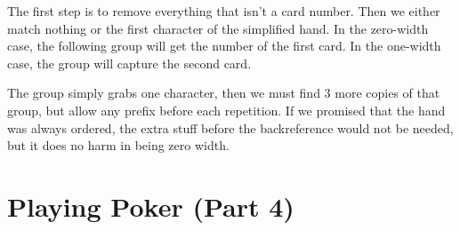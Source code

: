 \begin{Shaded}
\begin{Highlighting}[]
\OperatorTok{\textgreater{}\textgreater{}} 
\OperatorTok{=}\NormalTok{, }\StringTok{\textquotesingle{}\textquotesingle{}}
\OperatorTok{=} \VerbatimStringTok{\textquotesingle{}}
\OperatorTok{=}
\NormalTok{) } 
\OperatorTok{\textgreater{}\textgreater{}\textgreater{}}\NormalTok{) }
\CommentTok{\textquotesingle{}6\textquotesingle{}}
\OperatorTok{\textgreater{}\textgreater{}\textgreater{}}\NormalTok{) }
\CommentTok{\textquotesingle{}6\textquotesingle{}}
\OperatorTok{\textgreater{}\textgreater{}\textgreater{}}\NormalTok{) }
\end{Highlighting}
\end{Shaded}

The first step is to remove everything that isn't a card number. Then we
either match nothing or the first character of the simplified hand. In
the zero-width case, the following group will get the number of the
first card. In the one-width case, the group will capture the second
card.

The group simply grabs one character, then we must find 3 more copies of
that group, but allow any prefix before each repetition. If we promised
that the hand was always ordered, the extra stuff before the
backreference would not be needed, but it does no harm in being zero
width.

\newpage

\hypertarget{playing-poker-part-4}{%
\section{Playing Poker (Part 4)}\label{playing-poker-part-4}}


